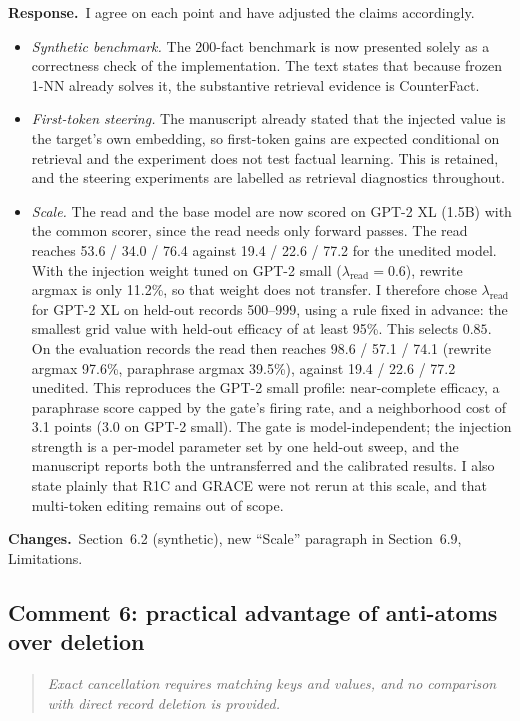 \documentclass[11pt]{article}
\newenvironment{reviewer}{\par\medskip\noindent\begin{quote}\itshape}{\end{quote}}
\newcommand{\response}{\par\noindent\textbf{Response.}\ }
\newcommand{\changes}{\par\smallskip\noindent\textbf{Changes.}\ }
\begin{document}
\response I agree on each point and have adjusted the claims accordingly.
\begin{itemize}
\item \emph{Synthetic benchmark.} The 200-fact benchmark is now presented solely as a correctness check of the implementation. The text states that because frozen 1-NN already solves it, the substantive retrieval evidence is CounterFact.
\item \emph{First-token steering.} The manuscript already stated that the injected value is the target's own embedding, so first-token gains are expected conditional on retrieval and the experiment does not test factual learning. This is retained, and the steering experiments are labelled as retrieval diagnostics throughout.
\item \emph{Scale.} The read and the base model are now scored on GPT-2 XL (1.5B) with the common scorer, since the read needs only forward passes. The read reaches 53.6 / 34.0 / 76.4 against 19.4 / 22.6 / 77.2 for the unedited model. With the injection weight tuned on GPT-2 small ($\lambda_{\mathrm{read}}=0.6$), rewrite argmax is only 11.2\%, so that weight does not transfer. I therefore chose $\lambda_{\mathrm{read}}$ for GPT-2 XL on held-out records 500--999, using a rule fixed in advance: the smallest grid value with held-out efficacy of at least 95\%. This selects $0.85$. On the evaluation records the read then reaches 98.6 / 57.1 / 74.1 (rewrite argmax 97.6\%, paraphrase argmax 39.5\%), against 19.4 / 22.6 / 77.2 unedited. This reproduces the GPT-2 small profile: near-complete efficacy, a paraphrase score capped by the gate's firing rate, and a neighborhood cost of 3.1 points (3.0 on GPT-2 small). The gate is model-independent; the injection strength is a per-model parameter set by one held-out sweep, and the manuscript reports both the untransferred and the calibrated results. I also state plainly that R1C and GRACE were not rerun at this scale, and that multi-token editing remains out of scope.
\end{itemize}

\changes Section~6.2 (synthetic), new ``Scale'' paragraph in Section~6.9, Limitations.

\subsection*{Comment 6: practical advantage of anti-atoms over deletion}

\begin{reviewer}
Exact cancellation requires matching keys and values, and no comparison with direct record deletion is provided.
\end{reviewer}
\end{document}
